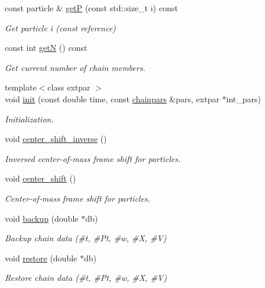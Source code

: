 \begin{DoxyCompactItemize}
const particle \& \hyperlink{classARC_1_1chain_a94fb8a78d6b34b4cb7376f92dfcd6f99}{getP} (const std\+::size\+\_\+t i) const
\begin{DoxyCompactList}\small\item\em Get particle i (const reference) \end{DoxyCompactList}\item 
const int \hyperlink{classARC_1_1chain_a43414423b01a8ee5e88f5c3cf28fd2c6}{getN} () const
\begin{DoxyCompactList}\small\item\em Get current number of chain members. \end{DoxyCompactList}\item 
{\footnotesize template$<$class extpar $>$ }\\void \hyperlink{classARC_1_1chain_a269690a2daece1dacb21a78e11b019a6}{init} (const double time, const \hyperlink{classARC_1_1chainpars}{chainpars} \&pars, extpar $\ast$int\+\_\+pars)
\begin{DoxyCompactList}\small\item\em Initialization. \end{DoxyCompactList}\item 
void \hyperlink{classARC_1_1chain_a52edc1843550578f5be5590b7403ef97}{center\+\_\+shift\+\_\+inverse} ()
\begin{DoxyCompactList}\small\item\em Inversed center-\/of-\/mass frame shift for particles. \end{DoxyCompactList}\item 
void \hyperlink{classARC_1_1chain_a68ae268afb418455bfdd6e8101b3b4eb}{center\+\_\+shift} ()
\begin{DoxyCompactList}\small\item\em Center-\/of-\/mass frame shift for particles. \end{DoxyCompactList}\item 
void \hyperlink{classARC_1_1chain_a587009b6c6db0490c0f335aba732d77a}{backup} (double $\ast$db)
\begin{DoxyCompactList}\small\item\em Backup chain data (\#t, \#\+Pt, \#w, \#X, \#V) \end{DoxyCompactList}\item 
void \hyperlink{classARC_1_1chain_a2e7873b3a50ba9276d9a7595cb1d768d}{restore} (double $\ast$db)
\begin{DoxyCompactList}\small\item\em Restore chain data (\#t, \#\+Pt, \#w, \#X, \#V) \end{DoxyCompactList}\item 

\end{DoxyCompactItemize}
